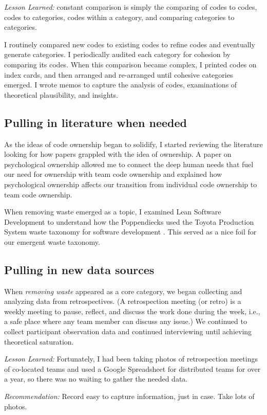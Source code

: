 \textit{Lesson Learned:} constant comparison is simply the comparing of codes to codes, codes to categories, codes within a category, and comparing categories to categories.

I routinely compared new codes to existing codes to refine codes and eventually generate categories. I periodically audited each category for cohesion by comparing its codes. When this comparison became complex, I printed codes on index cards, and then arranged and re-arranged until cohesive categories emerged. I wrote memos to capture the analysis of codes, examinations of theoretical plausibility, and insights.


\subsection{Pulling in literature when needed}
As the ideas of code ownership began to solidify, I started reviewing the literature looking for how papers grappled with the idea of ownership. A paper on psychological ownership \cite{Pierce2001} allowed me to connect the deep human needs that fuel our need for ownership with team code ownership and explained how psychological ownership affects our transition from individual code ownership to team code ownership.

When removing waste emerged as a topic, I examined Lean Software Development to understand how the Poppendiecks used the Toyota Production System waste taxonomy for software development \cite{PoppendieckConceptToCash}. This served as a nice foil for our emergent waste taxonomy.
\subsection{Pulling in new data sources}
When \textit{removing waste} appeared as a core category, we began collecting and analyzing data from retrospectives. (A retrospection meeting (or retro) is a weekly meeting to pause, reflect, and discuss the work done during the week, i.e., a safe place where any team member can discuss any issue.) We continued to collect participant observation data and continued interviewing until achieving theoretical saturation. 

\textit{Lesson Learned:}  Fortunately, I had been taking photos of retrospection meetings of co-located teams and used a Google Spreadsheet for distributed teams for over a year, so there was no waiting to gather the needed data. 

\textit{Recommendation:} Record easy to capture information, just in case. Take lots of photos.

